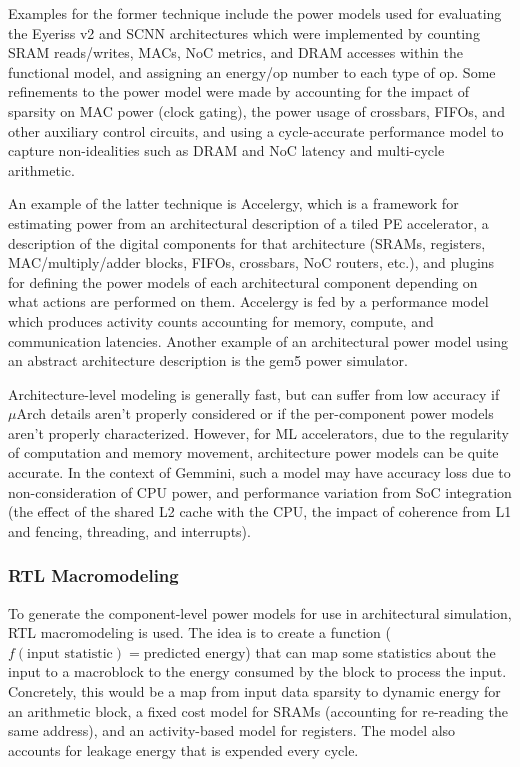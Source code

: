 \documentclass[sigconf]{acmart}
\begin{document}
Examples for the former technique include the power models used for evaluating the Eyeriss v2\cite{eyerissv2} and SCNN\cite{scnn} architectures which were implemented by counting SRAM reads/writes, MACs, NoC metrics, and DRAM accesses within the functional model, and assigning an energy/op number to each type of op.
Some refinements to the power model were made by accounting for the impact of sparsity on MAC power (clock gating), the power usage of crossbars, FIFOs, and other auxiliary control circuits, and using a cycle-accurate performance model to capture non-idealities such as DRAM and NoC latency and multi-cycle arithmetic.

An example of the latter technique is Accelergy\cite{accelergy}, which is a framework for estimating power from an architectural description of a tiled PE accelerator, a description of the digital components for that architecture (SRAMs, registers, MAC/multiply/adder blocks, FIFOs, crossbars, NoC routers, etc.), and plugins for defining the power models of each architectural component depending on what actions are performed on them.
Accelergy is fed by a performance model which produces activity counts accounting for memory, compute, and communication latencies.
Another example of an architectural power model using an abstract architecture description is the gem5 power simulator\cite{gem5power}.

Architecture-level modeling is generally fast, but can suffer from low accuracy if $\mu$Arch details aren't properly considered or if the per-component power models aren't properly characterized. However, for ML accelerators, due to the regularity of computation and memory movement, architecture power models can be quite accurate. In the context of Gemmini, such a model may have accuracy loss due to non-consideration of CPU power, and performance variation from SoC integration (the effect of the shared L2 cache with the CPU, the impact of coherence from L1 and fencing, threading, and interrupts).

\subsubsection{RTL Macromodeling}
To generate the component-level power models for use in architectural simulation, RTL macromodeling is used.
The idea is to create a function ($f(\text{input statistic}) = \text{predicted energy}$) that can map some statistics about the input to a macroblock to the energy consumed by the block to process the input.
Concretely, this would be a map from input data sparsity to dynamic energy for an arithmetic block, a fixed cost model for SRAMs (accounting for re-reading the same address), and an activity-based model for registers.
The model also accounts for leakage energy that is expended every cycle.
\end{document}
